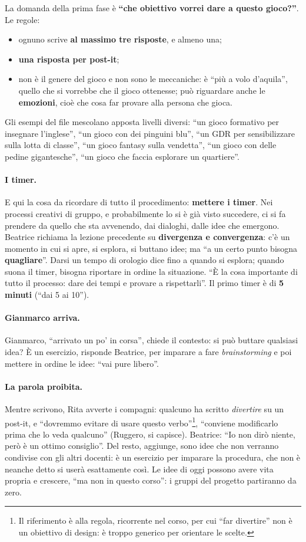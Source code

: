 La domanda della prima fase è \textbf{``che obiettivo vorrei dare a questo
gioco?''}. Le regole:
\begin{itemize}
  \item ognuno scrive \textbf{al massimo tre risposte}, e almeno una;
  \item \textbf{una risposta per post-it};
  \item non è il genere del gioco e non sono le meccaniche: è ``più a volo
        d'aquila'', quello che si vorrebbe che il gioco ottenesse; può riguardare
        anche le \textbf{emozioni}, cioè che cosa far provare alla persona che gioca.
\end{itemize}
Gli esempi del file mescolano apposta livelli diversi: ``un gioco formativo per
insegnare l'inglese'', ``un gioco con dei pinguini blu'', ``un GDR per sensibilizzare
sulla lotta di classe'', ``un gioco fantasy sulla vendetta'', ``un gioco con delle
pedine gigantesche'', ``un gioco che faccia esplorare un quartiere''.

\paragraph{I timer.} E qui la cosa da ricordare di tutto il procedimento:
\textbf{mettere i timer}. Nei processi creativi di gruppo, e probabilmente lo si è già
visto succedere, ci si fa prendere da quello che sta avvenendo, dai dialoghi, dalle
idee che emergono. Beatrice richiama la lezione precedente su \textbf{divergenza e
convergenza}: c'è un momento in cui si apre, si esplora, si buttano idee; ma ``a un
certo punto bisogna \textbf{quagliare}''. Darsi un tempo di orologio dice fino a
quando si esplora; quando suona il timer, bisogna riportare in ordine la situazione.
``È la cosa importante di tutto il processo: dare dei tempi e provare a
rispettarli''. Il primo timer è di \textbf{5 minuti} (``dai 5 ai 10'').

\paragraph{Gianmarco arriva.} Gianmarco, ``arrivato un po' in corsa'', chiede il
contesto: si può buttare qualsiasi idea? È un esercizio, risponde Beatrice, per
imparare a fare \emph{brainstorming} e poi mettere in ordine le idee: ``vai pure
libero''.

\paragraph{La parola proibita.} Mentre scrivono, Rita avverte i compagni: qualcuno
ha scritto \emph{divertire} su un post-it, e ``dovremmo evitare di usare questo
verbo''\footnote{Il riferimento è alla regola, ricorrente nel corso, per cui ``far
divertire'' non è un obiettivo di design: è troppo generico per orientare le
scelte.}, ``conviene modificarlo prima che lo veda qualcuno'' (Ruggero, si
capisce). Beatrice: ``Io non dirò niente, però è un ottimo consiglio''. Del resto,
aggiunge, sono idee che non verranno condivise con gli altri docenti: è un esercizio
per imparare la procedura, che non è neanche detto si userà esattamente così. Le idee
di oggi possono avere vita propria e crescere, ``ma non in questo corso'': i gruppi
del progetto partiranno da zero.

